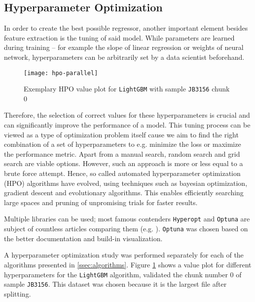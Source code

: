 \subsection{Hyperparameter Optimization}\label{ssec:hpo}
In order to create the best possible regressor, another important element besides feature extraction is the tuning of said model. 
While parameters are learned during training – for example the slope of linear regression or weights of neural network, hyperparameters can be arbitrarily set by a data scientist beforehand.



\begin{figure}[h]
	\centering
	\texttt{[image: hpo-parallel]}
	\caption{Exemplary HPO value plot for \texttt{LightGBM} with sample \texttt{JB3156} chunk 0}
	\label{fig:hpo-parallel}
\end{figure}



Therefore, the selection of correct values for these hyperparameters is crucial and can significantly improve the performance of a model.
This tuning process can be viewed as a type of optimization problem itself cause we aim to find the right combination of a set of hyperparameters to e.g. minimize the loss or maximize the performance metric.
Apart from a manual search, random search and grid search are viable options.
However, such an approach is more or less equal to a brute force attempt.
Hence, so called automated hyperparameter optimization (HPO) algorithms have evolved, using techniques such as bayesian optimization, gradient descent and evolutionary algorithms.
This enables efficiently searching large spaces and pruning of unpromising trials for faster results.


Multiple libraries can be used; most famous contenders \texttt{Hyperopt} \cite{DBLP:conf/icml/BergstraYC13} and \texttt{Optuna} \cite{DBLP:conf/kdd/AkibaSYOK19} are subject of countless articles comparing them (e.g. \cite{neptune_2019}). \texttt{Optuna} was chosen based on the better documentation and build-in visualization.


A hyperparameter optimization study was performed separately for each of the algorithms presented in \ref{ssec:algorithms}.
Figure \ref{fig:hpo-parallel} shows a value plot for different hyperparameters for the \texttt{LightGBM} \cite{DBLP:conf/nips/KeMFWCMYL17} algorithm, validated the chunk number $0$ of sample \texttt{JB3156}.
This dataset was chosen because it is the largest file after splitting.

